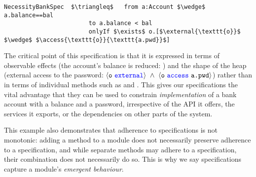 %
%
%
%
%
%
\begin{lstlisting}[language = Chainmail, mathescape=true, frame=lines]
NecessityBankSpec  $\triangleq$   from a:Account $\wedge$ a.balance==bal
                        to a.balance < bal
                        onlyIf $\exists$ o.[$\external{\texttt{o}}$ $\wedge$ $\access{\texttt{o}}{\texttt{a.pwd}}$]
\end{lstlisting}
%
%
% 
The critical point of this \Nec specification is that it is
expressed in terms of observable effects (the account's balance is
reduced: ) and the shape of the heap 
(external access to the password:
$\external{\prg{o}}\ \wedge\ \access{\prg{o}}{\prg{a.pwd}}$) 
rather than in terms of individual methods such as
 and .
This gives our specifications the
vital advantage that they can be used to constrain
\textit{implementation} of a bank account with a balance and a
password, irrespective of the API it
offers, the services it exports, or the dependencies on other parts of
the system.

{This example also demonstrates that 
adherence to   \Nec specifications is not monotonic:
adding a method to a module does not necessarily preserve adherence to
a specification, 
and while separate methods may adhere to a  specification, their combination does
not necessarily do so. This is why we say \Nec specifications capture a module's \emph{emergent behaviour}. 
}

